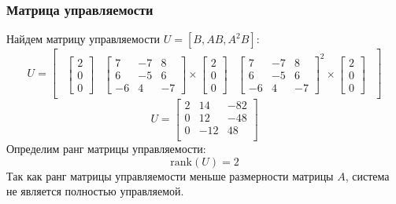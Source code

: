 \subsubsection{Матрица управляемости}
Найдем матрицу управляемости $U = [B, AB, A^2B]$:
\begin{equation}
    U = \begin{bmatrix} 
        \begin{array}{c|c|c}
            \begin{bmatrix}
                2 \\
                0 \\
                0
            \end{bmatrix} & 
            \begin{bmatrix}
                7 & -7 & 8 \\
                6 & -5 & 6 \\
                -6 & 4 & -7
            \end{bmatrix} \times 
            \begin{bmatrix}
                2 \\
                0 \\
                0
            \end{bmatrix} &
            \begin{bmatrix}
                7 & -7 & 8 \\
                6 & -5 & 6 \\
                -6 & 4 & -7
            \end{bmatrix}^2 \times
            \begin{bmatrix}
                2 \\
                0 \\
                0
            \end{bmatrix}
        \end{array}   
    \end{bmatrix}
\end{equation}
\begin{equation}
    U = \begin{bmatrix}
    2 & 14 & -82 \\ 
    0 & 12 & -48 \\ 
    0 & -12 & 48 \\ 
    \end{bmatrix}
\end{equation}
Определим ранг матрицы управляемости:
\begin{equation}
    \text{rank}(U) = 2
\end{equation}
Так как ранг матрицы управляемости меньше размерности матрицы $A$, система не является полностью управляемой. 

